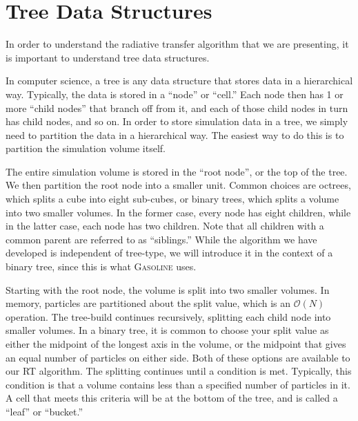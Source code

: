 

\section{Tree Data Structures}
\label{sec:treestruct}

In order to understand the radiative transfer algorithm that we are presenting, it is important to understand tree data structures.

In computer science, a tree is any data structure that stores data in a hierarchical way. Typically, the data is stored in a ``node'' or ``cell.'' Each node then has 1 or more ``child nodes'' that branch off from it, and each of those child nodes in turn has child nodes, and so on. In order to store simulation data in a tree, we simply need to partition the data in a hierarchical way. The easiest way to do this is to partition the simulation volume itself.

The entire simulation volume is stored in the ``root node'', or the top of the tree. We then partition the root node into a smaller unit. Common choices are octrees, which splits a cube into eight sub-cubes, or binary trees, which splits a volume into two smaller volumes. In the former case, every node has eight children, while in the latter case, each node has two children. Note that all children with a common parent are referred to as ``siblings.'' While the algorithm we have developed is independent of tree-type, we will introduce it in the context of a binary tree, since this is what \textsc{Gasoline} uses.

Starting with the root node, the volume is split into two smaller volumes. In memory, particles are partitioned about the split value, which is an $\mathcal{O}(N)$ operation. The tree-build continues recursively, splitting each child node into smaller volumes. In a binary tree, it is common to choose your split value as either the midpoint of the longest axis in the volume, or the midpoint that gives an equal number of particles on either side. Both of these options are available to our RT algorithm. The splitting continues until a condition is met. Typically, this condition is that a volume contains less than a specified number of particles in it. A cell that meets this criteria will be at the bottom of the tree, and is called a ``leaf'' or ``bucket.''

